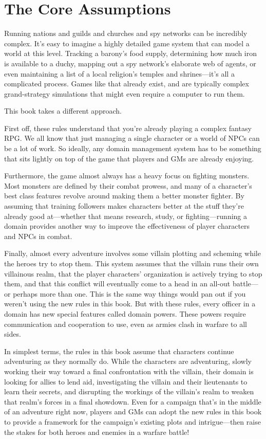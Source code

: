 \documentclass[10pt,a4paper,twoside,bg=print,twocolumn,openany,nodeprecatedcode]{dndbook}
\begin{document}
\section{The Core Assumptions}
Running nations and guilds and churches and spy networks can be incredibly complex. It's easy to imagine a highly detailed game system that can model a world at this level. Tracking a barony's food supply, determining how much iron is available to a duchy, mapping out a spy network's elaborate web of agents, or even maintaining a list of a local religion's temples and shrines—it's all a complicated process. Games like that already exist, and are typically complex grand-strategy simulations that might even require a computer to run them.

This book takes a different approach.

First off, these rules understand that you're already playing a complex fantasy RPG. We all know that just managing a single character or a world of NPCs can be a lot of work. So ideally, any domain management system has to be something that sits lightly on top of the game that players and GMs are already enjoying.

Furthermore, the game almost always has a heavy focus on fighting monsters. Most monsters are defined by their combat prowess, and many of a character's best class features revolve around making them a better monster fighter. By assuming that training followers makes characters better at the stuff they're already good at—whether that means research, study, or fighting—running a domain provides another way to improve the effectiveness of player characters and NPCs in combat.

Finally, almost every adventure involves some villain plotting and scheming while the heroes try to stop them. This system assumes that the villain runs their own villainous realm, that the player characters' organization is actively trying to stop them, and that this conflict will eventually come to a head in an all-out battle—or perhaps more than one. This is the same way things would pan out if you weren't using the new rules in this book. But with these rules, every officer in a domain has new special features called domain powers. These powers require communication and cooperation to use, even as armies clash in warfare to all sides.

In simplest terms, the rules in this book assume that characters continue adventuring as they normally do. While the characters are adventuring, slowly working their way toward a final confrontation with the villain, their domain is looking for allies to lend aid, investigating the villain and their lieutenants to learn their secrets, and disrupting the workings of the villain's realm to weaken that realm's forces in a final showdown. Even for a campaign that's in the middle of an adventure right now, players and GMs can adopt the new rules in this book to provide a framework for the campaign's existing plots and intrigue—then raise the stakes for both heroes and enemies in a warfare battle!
\end{document}
